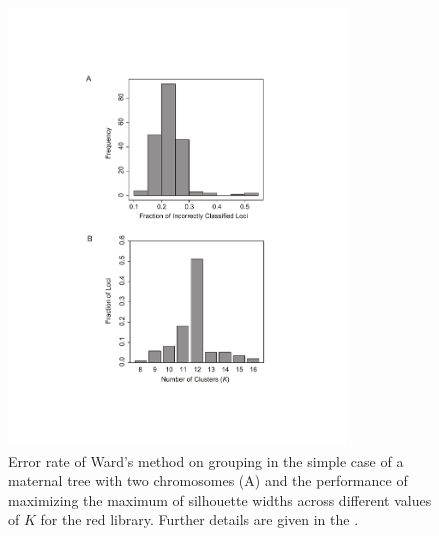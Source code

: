 \documentclass[11pt]{article}
\begin{document}
\begin{figure}[ht]
\centering
\includegraphics[width=0.8\textwidth]{misclassified}
\caption{Error rate of Ward's method on grouping in the simple case of a maternal tree with
two chromosomes (A) and the performance of maximizing the maximum of silhouette widths
across different values of $K$ for the red library. Further details are given in the .}
\label{f:misclassified.pdf}
\end{figure}
\end{document}
